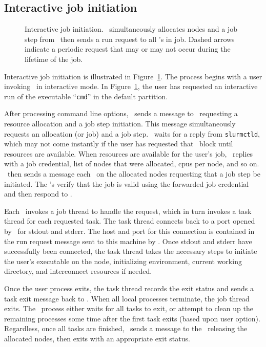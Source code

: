 \subsection{Interactive job initiation}

\begin{figure}[tb]
\centerline{ }
\caption{\small Interactive job initiation. \srun\ simultaneously allocates
nodes
         and a job step from \slurmctld\ then sends a run request to all
	 \slurmd 's in job. Dashed arrows indicate a periodic request that
	 may or may not occur during the lifetime of the job.}
\label{init-interactive}
\end{figure}

Interactive job initiation is illustrated in Figure~\ref{init-interactive}.
The process begins with a user invoking \srun\ in interactive mode. 
In Figure~\ref{init-interactive}, the user has requested an interactive
run of the executable ``{\tt cmd}'' in the default partition. 

After processing command line options, \srun\ sends a message to
\slurmctld\ requesting a resource allocation and a job step initiation. 
This message simultaneously requests an allocation (or job) and a job step. 
\srun\ waits for a reply from {\tt slurmctld}, which may not come instantly 
if the user has requested that \srun\ block until resources are available. 
When resources are available
for the user's job, \slurmctld\ replies with a job credential, list of
nodes that were allocated, cpus per node, and so on. \srun\ then sends
a message each \slurmd\ on the allocated nodes requesting that a job
step be initiated. The \slurmd 's verify that the job is valid using
the forwarded job credential and then respond to \srun .

Each \slurmd\ invokes a job thread to handle the request, which in turn
invokes a task thread for each requested task. The task thread connects
back to a port opened by \srun\ for stdout and stderr. The host and
port for this connection is contained in the run request message sent
to this machine by \srun . Once stdout and stderr have successfully 
been connected, the task thread takes the necessary steps to initiate 
the user's executable on the node, initializing environment, current
working directory, and interconnect resources if needed. 

Once the user process exits, the task thread records the exit status and
sends a task exit message back to \srun . When all local processes
terminate, the job thread exits. The \srun\ process either waits
for all tasks to exit, or attempt to clean up the remaining processes
some time after the first task exits (based upon user option). 
Regardless, once all
tasks are finished, \srun\ sends a message to the \slurmctld\ releasing
the allocated nodes, then exits with an appropriate exit status.

